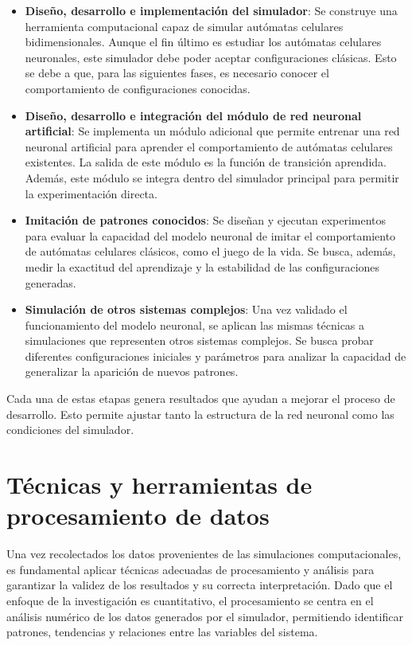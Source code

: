 \begin{itemize}
	
	\item \textbf{Diseño, desarrollo e implementación del simulador}: Se construye una herramienta computacional capaz de simular autómatas celulares bidimensionales. Aunque el fin último es estudiar los autómatas celulares neuronales, este simulador debe poder aceptar configuraciones clásicas. Esto se debe a que, para las siguientes fases, es necesario conocer el comportamiento de configuraciones conocidas.
	
	\item \textbf{Diseño, desarrollo e integración del módulo de red neuronal artificial}: Se implementa un módulo adicional que permite entrenar una red neuronal artificial para aprender el comportamiento de autómatas celulares existentes. La salida de este módulo es la función de transición aprendida. Además, este módulo se integra dentro del simulador principal para permitir la experimentación directa.
	
	\item \textbf{Imitación de patrones conocidos}: Se diseñan y ejecutan experimentos para evaluar la capacidad del modelo neuronal de imitar el comportamiento de autómatas celulares clásicos, como el juego de la vida. Se busca, además, medir la exactitud del aprendizaje y la estabilidad de las configuraciones generadas. 
	
	\item \textbf{Simulación de otros sistemas complejos}: Una vez validado el funcionamiento del modelo neuronal, se aplican las mismas técnicas a simulaciones que representen otros sistemas complejos. Se busca probar diferentes configuraciones iniciales y parámetros para analizar la capacidad de generalizar la aparición de nuevos patrones.
	
\end{itemize}

Cada una de estas etapas genera resultados que ayudan a mejorar el proceso de desarrollo. Esto permite ajustar tanto la estructura de la red neuronal como las condiciones del simulador.

\section{Técnicas y herramientas de procesamiento de datos}

Una vez recolectados los datos provenientes de las simulaciones computacionales, es fundamental aplicar técnicas adecuadas de procesamiento y análisis para garantizar la validez de los resultados y su correcta interpretación. Dado que el enfoque de la investigación es cuantitativo, el procesamiento se centra en el análisis numérico de los datos generados por el simulador, permitiendo identificar patrones, tendencias y relaciones entre las variables del sistema.

